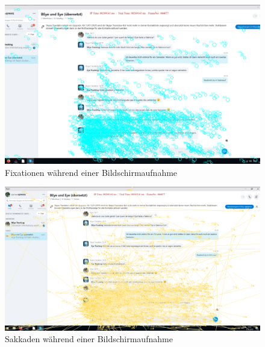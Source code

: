 \vfill
\begin{figure}[H]
    \includegraphics[width=\textwidth]{Figures/Fixmaps/CatDe/Overlay_Image_TN24_Trial_1_Fixations}
	\caption{Fixationen während einer Bildschirmaufnahme\label{K6:fig:fixations-TN24}}
\end{figure}
\vfill\pagebreak




\begin{figure}
    \includegraphics[width=\textwidth]{Figures/Fixmaps/CatDe/Overlay_Image_TN24_Trial_1_Saccades}
	\caption{Sakkaden während einer Bildschirmaufnahme\label{K6:fig:sacmove-TN24}}
\end{figure}



